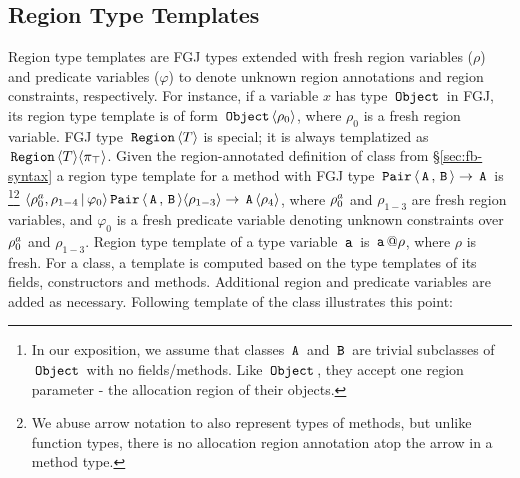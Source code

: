 \subsection{Region Type Templates}
\label{sec:fb-templatization}

Region type templates are FGJ types extended with fresh region
variables ($\rho$) and predicate variables ($\varphi$) to denote
unknown region annotations and region constraints, respectively. For
instance, if a variable $x$ has type $\,{\tt Object}\,$ in FGJ, its region type
template is of form $\,{\tt Object}\,\langle \rho_0 \rangle$, where $\rho_0$ is a fresh
region variable. FGJ type $\,{\tt Region}\,\langle T \rangle$ is special; it is always
templatized as $\,{\tt Region}\,{\langle T \rangle}\langle \pi_{\top} \rangle$. Given the
region-annotated definition of  class from
\S\ref{sec:fb-syntax} a region type template for a method with FGJ
type $\,{\tt Pair}\,\langle \,{\tt A}\,,\,{\tt B}\, \rangle \rightarrow \,{\tt A}\,$ is \footnote{In
our exposition, we assume that classes $\,{\tt A}\,$ and $\,{\tt B}\,$ are trivial
subclasses of $\,{\tt Object}\,$ with no fields/methods. Like $\,{\tt Object}\,$, they
accept one region parameter - the allocation region of their
objects.}\footnote{We abuse arrow notation to also represent types of
methods, but unlike function types, there is no allocation region
annotation atop the arrow in a method type.}
$\langle \rho^a_0,\rho_{1-4} \,|\, \varphi_0 \rangle
\,{\tt Pair}\,\langle \,{\tt A}\,,\,{\tt B}\, \rangle \langle \rho_{1-3} \rangle \rightarrow
\,{\tt A}\,\langle \rho_4 \rangle$, where $\rho^a_0$ and $\rho_{1-3}$ are fresh
region variables, and $\varphi_0$ is a fresh predicate variable
denoting unknown constraints over $\rho^a_0$ and $\rho_{1-3}$.
Region type template of a type variable $\,{\tt a}\,$ is $\,{\tt a}\,@\rho$, where
$\rho$ is fresh. For a class, a template is computed based on the 
type templates of its fields, constructors and methods. Additional
region and predicate variables are added as necessary. Following template 
of the  class illustrates this point:
